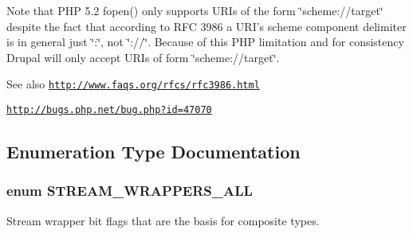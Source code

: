 Note that PHP 5.2 fopen() only supports URIs of the form \char`\"{}scheme://target\char`\"{} despite the fact that according to RFC 3986 a URI's scheme component delimiter is in general just \char`\"{}:\char`\"{}, not \char`\"{}://\char`\"{}. Because of this PHP limitation and for consistency Drupal will only accept URIs of form \char`\"{}scheme://target\char`\"{}.

\begin{DoxySeeAlso}{See also}
\href{http://www.faqs.org/rfcs/rfc3986.html}{\tt http://www.faqs.org/rfcs/rfc3986.html} 

\href{http://bugs.php.net/bug.php?id=47070}{\tt http://bugs.php.net/bug.php?id=47070} 
\end{DoxySeeAlso}


\subsection{Enumeration Type Documentation}
\hypertarget{stream__wrappers_8inc_aa396b3c5df01b437c006cf7ee9674f66}{
\subsubsection[{STREAM\_\-WRAPPERS\_\-ALL}]{\setlength{\rightskip}{0pt plus 5cm}enum {\bf STREAM\_\-WRAPPERS\_\-ALL}}}
\label{stream__wrappers_8inc_aa396b3c5df01b437c006cf7ee9674f66}
Stream wrapper bit flags that are the basis for composite types.

